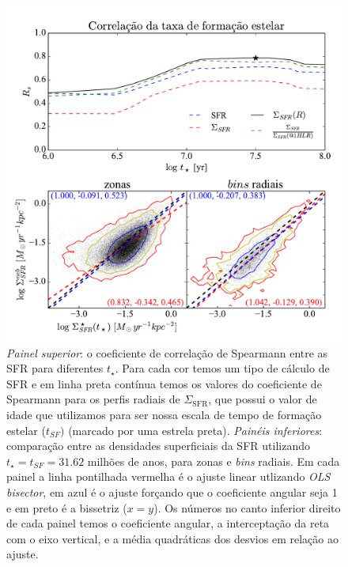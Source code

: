 \begin{figure}
	\centering
	\includegraphics[scale=0.7, clip]{figuras/Rs_allSFR.pdf}
	\caption[Comparação entre as SFR]
	{\emph{Painel superior}: o coeficiente de correlação de Spearmann entre as SFR para diferentes
$t_\star$. Para cada cor temos um tipo de cálculo de SFR e em linha preta contínua temos os valores
do coeficiente de Spearmann para os perfis radiais de $\Sigma_{\mathrm{SFR}}$, que possui o valor de
idade que utilizamos para ser nossa escala de tempo de formação estelar ($t_{SF})$ (marcado
por uma estrela preta). \emph{Painéis inferiores}: comparação entre as densidades superficiais da
SFR utilizando $t_\star = t_{SF} = 31.62$ milhões de anos, para zonas e {\em bins} radiais. Em cada
painel a linha pontilhada vermelha é o ajuste linear utlizando {\em OLS bisector}, em azul é o ajuste
forçando que o coeficiente angular seja 1 e em preto é a bissetriz ($x = y$). Os números no canto
inferior direito de cada painel temos o coeficiente angular, a interceptação da reta com o eixo
vertical, e a média quadráticas dos desvios em relação ao ajuste.}
	\label{fig:SFRsynvsneb}
\end{figure}

